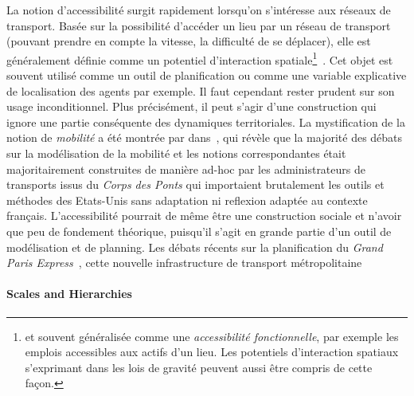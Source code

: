 {La notion d'accessibilité surgit rapidement lorsqu'on s'intéresse aux réseaux de transport. Basée sur la possibilité d'accéder un lieu par un réseau de transport (pouvant prendre en compte la vitesse, la difficulté de se déplacer), elle est généralement définie comme un potentiel d'interaction spatiale\footnote{et souvent généralisée comme une \emph{accessibilité fonctionnelle}, par exemple les emplois accessibles aux actifs d'un lieu. Les potentiels d'interaction spatiaux s'exprimant dans les lois de gravité peuvent aussi être compris de cette façon.}~\cite{bavoux2005geographie}. Cet objet est souvent utilisé comme un outil de planification ou comme une variable explicative de localisation des agents par exemple. Il faut cependant rester prudent sur son usage inconditionnel. Plus précisément, il peut s'agir d'une construction qui ignore une partie conséquente des dynamiques territoriales. La mystification de la notion de \emph{mobilité} a été montrée par  dans~\cite{commenges:tel-00923682}, qui révèle que la majorité des débats sur la modélisation de la mobilité et les notions correspondantes était majoritairement construites de manière ad-hoc par les administrateurs de transports issus du \emph{Corps des Ponts} qui importaient brutalement les outils et méthodes des Etats-Unis sans adaptation ni reflexion adaptée au contexte français. L'accessibilité pourrait de même être une construction sociale et n'avoir que peu de fondement théorique, puisqu'il s'agit en grande partie d'un outil de modélisation et de planning. Les débats récents sur la planification du \emph{Grand Paris Express}~\cite{confMangin}, cette nouvelle infrastructure de transport métropolitaine
}

\paragraph{Scales and Hierarchies}




